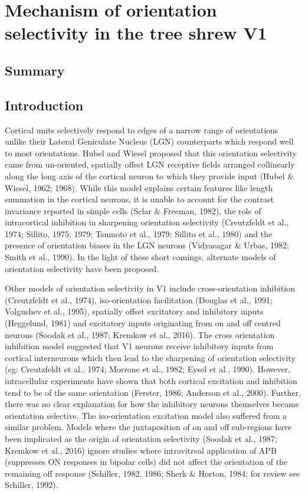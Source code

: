 \chapter {Mechanism of orientation selectivity in the tree shrew V1}
\pagebreak
\section{Summary}
\pagebreak
\section{Introduction}

Cortical units selectively respond to edges of a narrow range of orientations unlike their Lateral Geniculate Nucleus (LGN) counterparts which respond well to most orientations. Hubel and Wiesel proposed that this orientation selectivity came from un-oriented, spatially offset LGN receptive fields arranged collinearly along the long axis of the cortical neuron to which they provide input (Hubel \& Wiesel, 1962; 1968). While this model explains certain features like length summation in the cortical neurons, it is unable to account for the contrast invariance reported in simple cells (Sclar \& Freeman, 1982), the role of intracortical inhibition in sharpening orientation selectivity (Creutzfeldt et al., 1974; Sillito, 1975; 1979; Tsumoto et al., 1979; Sillito et al., 1980) and the presence of orientation biases in the LGN neurons (Vidyasagar \& Urbas, 1982; Smith et al., 1990). In the light of these short comings, alternate models of orientation selectivity have been proposed.

Other models of orientation selectivity in V1 include cross-orientation inhibition (Creutzfeldt et al., 1974), iso-orientation facilitation (Douglas et al., 1991; Volgushev et al., 1995), spatially offset excitatory and inhibitory inputs (Heggelund, 1981) and excitatory inputs originating from on and off centred neurons (Soodak et al., 1987; Kremkow et al., 2016). The cross orientation inhibition model suggested that V1 neurons receive inhibitory inputs from cortical interneurons which then lead to the sharpening of orientation selectivity (eg: Creutzfeldt et al., 1974; Morrone et al., 1982; Eysel et al., 1990). However, intracellular experiments have shown that both cortical excitation and inhibition tend to be of the same orientation (Ferster, 1986; Anderson et al., 2000). Further, there was no clear explanation for how the inhibitory neurons themselves became orientation selective. The iso-orientation excitation model also suffered from a similar problem. Models where the juxtaposition of on and off sub-regions have been implicated as the origin of orientation selectivity (Soodak et al., 1987; Kremkow et al., 2016) ignore studies where intravitreal application of APB (suppresses ON responses in bipolar cells) did not affect the orientation of the remaining off response (Schiller, 1982, 1986; Sherk \& Horton, 1984; for review see Schiller, 1992).

